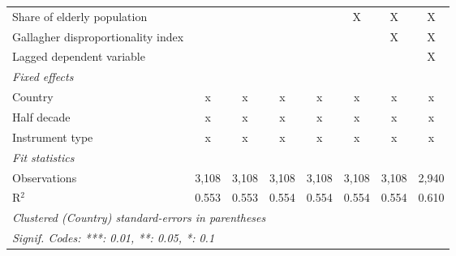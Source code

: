\begin{tabular}{lccccccc}
   Share of elderly population                                              &               &               &               &               & X             & X             & X\\  
   Gallagher disproportionality index                                       &               &               &               &               &               & X             & X\\  
   Lagged dependent variable                                                &               &               &               &               &               &               & X\\  
   \emph{Fixed effects}\\
   Country                                                                  & x             & x             & x             & x             & x             & x             & x\\  
   Half decade                                                              & x             & x             & x             & x             & x             & x             & x\\  
   Instrument type                                                          & x             & x             & x             & x             & x             & x             & x\\  
   \midrule \emph{Fit statistics}\\
   Observations                                                             & 3,108         & 3,108         & 3,108         & 3,108         & 3,108         & 3,108         & 2,940\\  
   R$^2$                                                                    & 0.553         & 0.553         & 0.554         & 0.554         & 0.554         & 0.554         & 0.610\\  
   \midrule
   \multicolumn{8}{l}{\emph{Clustered (Country) standard-errors in parentheses}}\\
   \multicolumn{8}{l}{\emph{Signif. Codes: ***: 0.01, **: 0.05, *: 0.1}}\\
\end{tabular}
\par\endgroup


